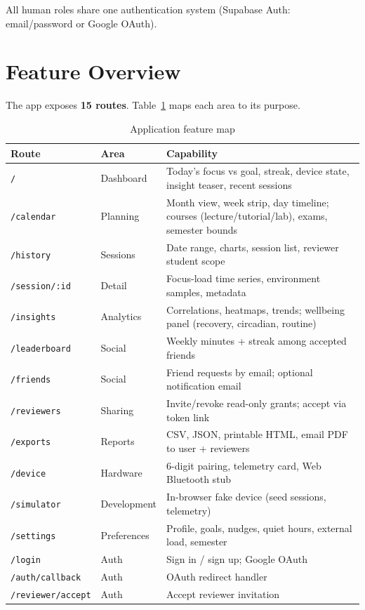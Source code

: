 \documentclass[11pt,a4paper]{article}
\newcommand{\filepath}[1]{\texttt{#1}}
\begin{document}
All human roles share one authentication system (Supabase Auth: email/password or Google OAuth).

\section{Feature Overview}

The app exposes \textbf{15 routes}. Table~\ref{tab:features} maps each area to its purpose.

\begin{table}[h]
\centering
\small
\caption{Application feature map}
\label{tab:features}
\begin{tabular}{@{}llp{6.8cm}@{}}
\toprule
\textbf{Route} & \textbf{Area} & \textbf{Capability} \\
\midrule
\filepath{/} & Dashboard & Today's focus vs goal, streak, device state, insight teaser, recent sessions \\
\filepath{/calendar} & Planning & Month view, week strip, day timeline; courses (lecture/tutorial/lab), exams, semester bounds \\
\filepath{/history} & Sessions & Date range, charts, session list, reviewer student scope \\
\filepath{/session/:id} & Detail & Focus-load time series, environment samples, metadata \\
\filepath{/insights} & Analytics & Correlations, heatmaps, trends; wellbeing panel (recovery, circadian, routine) \\
\filepath{/leaderboard} & Social & Weekly minutes + streak among accepted friends \\
\filepath{/friends} & Social & Friend requests by email; optional notification email \\
\filepath{/reviewers} & Sharing & Invite/revoke read-only grants; accept via token link \\
\filepath{/exports} & Reports & CSV, JSON, printable HTML, email PDF to user + reviewers \\
\filepath{/device} & Hardware & 6-digit pairing, telemetry card, Web Bluetooth stub \\
\filepath{/simulator} & Development & In-browser fake device (seed sessions, telemetry) \\
\filepath{/settings} & Preferences & Profile, goals, nudges, quiet hours, external load, semester \\
\filepath{/login} & Auth & Sign in / sign up; Google OAuth \\
\filepath{/auth/callback} & Auth & OAuth redirect handler \\
\filepath{/reviewer/accept} & Auth & Accept reviewer invitation \\
\bottomrule
\end{tabular}
\end{table}
\end{document}
